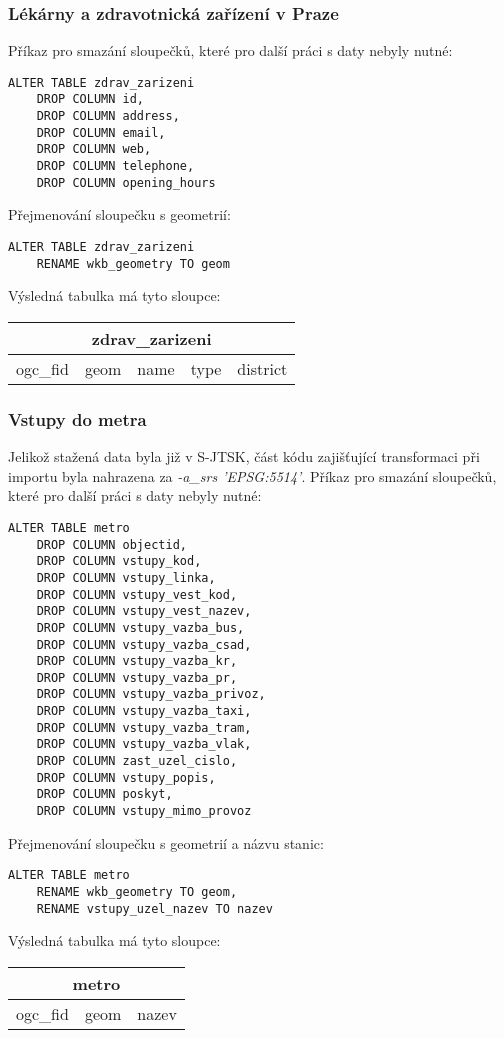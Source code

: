 \documentclass[a4paper, 12pt]{article}
\begin{document}
\subsubsection*{Lékárny a zdravotnická zařízení v Praze}
Příkaz pro smazání sloupečků, které pro další práci s daty nebyly nutné:
\begin{lstlisting}
ALTER TABLE zdrav_zarizeni
    DROP COLUMN id,
    DROP COLUMN address,
    DROP COLUMN email,
    DROP COLUMN web,
    DROP COLUMN telephone,
    DROP COLUMN opening_hours
\end{lstlisting}
Přejmenování sloupečku s geometrií:
\begin{lstlisting}
ALTER TABLE zdrav_zarizeni
    RENAME wkb_geometry TO geom
\end{lstlisting} 
Výsledná tabulka má tyto sloupce:
\begin{table}[h!]
\centering
\begin{tabular}{|c|c|c|c|c|}
\hline
\multicolumn{5}{|c|}{\textbf{zdrav\_zarizeni}} \\ \hline
ogc\_fid   & geom  & name  & type  & district  \\ \hline
\end{tabular}
\end{table}

\subsubsection*{Vstupy do metra}
Jelikož stažená data byla již v S-JTSK, část kódu zajišťující transformaci při importu byla nahrazena za \textsl{-a\_srs 'EPSG:5514'}. Příkaz pro smazání sloupečků, které pro další práci s daty nebyly nutné:
\begin{lstlisting}
ALTER TABLE metro
    DROP COLUMN objectid,
    DROP COLUMN vstupy_kod,
    DROP COLUMN vstupy_linka,
    DROP COLUMN vstupy_vest_kod,
    DROP COLUMN vstupy_vest_nazev,
    DROP COLUMN vstupy_vazba_bus,
    DROP COLUMN vstupy_vazba_csad,
    DROP COLUMN vstupy_vazba_kr,
    DROP COLUMN vstupy_vazba_pr,
    DROP COLUMN vstupy_vazba_privoz,
    DROP COLUMN vstupy_vazba_taxi,
    DROP COLUMN vstupy_vazba_tram,
    DROP COLUMN vstupy_vazba_vlak,
    DROP COLUMN zast_uzel_cislo,
    DROP COLUMN vstupy_popis,
    DROP COLUMN poskyt,
    DROP COLUMN vstupy_mimo_provoz
\end{lstlisting}
Přejmenování sloupečku s geometrií a názvu stanic:
\begin{lstlisting}
ALTER TABLE metro
    RENAME wkb_geometry TO geom,
    RENAME vstupy_uzel_nazev TO nazev
\end{lstlisting} 
Výsledná tabulka má tyto sloupce:
\begin{table}[h!]
\centering
\begin{tabular}{|c|c|c|}
\hline
\multicolumn{3}{|c|}{\textbf{metro}} \\ \hline
ogc\_fid      & geom     & nazev     \\ \hline
\end{tabular}
\end{table}
\end{document}
